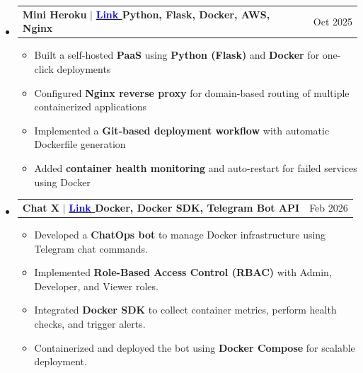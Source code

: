 \documentclass[letterpaper,11pt]{article}
\makeatletter
\newcommand{\resumeProjectHeading}[2]{
\item
\begin{tabular*}{0.97\textwidth}{l@{\extracolsep{\fill}}r}
\small#1 & #2 \\
\end{tabular*}\vspace{-7pt}
}
\newcommand{\resumeSubHeadingListStart}{\begin{itemize}[leftmargin=0.15in, label={}]}
\newcommand{\resumeSubHeadingListEnd}{\end{itemize}}
\makeatother
\begin{document}
\resumeSubHeadingListStart

\resumeProjectHeading
{\large\textbf{Mini Heroku} $|$ \href{https://github.com/SumitWiki/Mini-Heroku-}{\textbf{\textcolor{blue}{Link }}\faIcon{github}} \footnotesize\textbf{Python, Flask, Docker, AWS, Nginx}} {Oct 2025}

\begin{itemize}
    \item Built a self-hosted \textbf{PaaS} using \textbf{Python (Flask)} and \textbf{Docker} for one-click deployments
    \item Configured \textbf{Nginx reverse proxy} for domain-based routing of multiple containerized applications
    \item Implemented a \textbf{Git-based deployment workflow} with automatic Dockerfile generation
    \item Added \textbf{container health monitoring} and auto-restart for failed services using Docker
\end{itemize}


\resumeProjectHeading
{\large\textbf{Chat X} $|$ \href{https://github.com/SumitWiki/dev-bot-chatops/tree/main}{\textbf{\textcolor{blue}{Link }}\faIcon{github}}\footnotesize\textbf{ Docker, Docker SDK, Telegram Bot API}} {Feb 2026}

\begin{itemize}
    \item Developed a \textbf{ChatOps bot} to manage Docker infrastructure using Telegram chat commands.
    \item Implemented \textbf{Role-Based Access Control (RBAC)} with Admin, Developer, and Viewer roles.
    \item Integrated \textbf{Docker SDK} to collect container metrics, perform health checks, and trigger alerts.
    \item Containerized and deployed the bot using \textbf{Docker Compose} for scalable deployment.
\end{itemize}




\resumeSubHeadingListEnd







\end{document}
